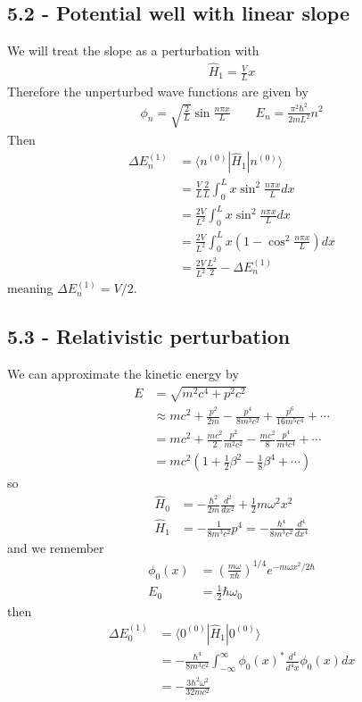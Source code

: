 \documentclass[10pt,a4paper]{book}
\theoremstyle{definition}
\begin{document}
\subsection{5.2 - Potential well with linear slope}
We will treat the slope as a perturbation with
\begin{align}
\hat{H}_1=\frac{V}{L}x
\end{align} 
Therefore the unperturbed wave functions are given by
\begin{align}
\phi_n=\sqrt{\frac{2}{L}}\sin\frac{n\pi x}{L}\qquad
E_n=\frac{\pi^2\hbar^2}{2mL^2}n^2
\end{align}
Then
\begin{align}
\Delta E_n^{(1)}
&=\langle n^{(0)}|\hat{H}_1|n^{(0)}\rangle\\
&=\frac{V}{L}\frac{2}{L}\int_0^L x\sin^2\frac{n\pi x}{L}dx\\
&=\frac{2V}{L^2}\int_0^L x\sin^2\frac{n\pi x}{L}dx\\
&=\frac{2V}{L^2}\int_0^L x\left(1-\cos^2\frac{n\pi x}{L}\right)dx\\
&=\frac{2V}{L^2}\frac{L^2}{2}-\Delta E_n^{(1)}
\end{align}
meaning $\Delta E_n^{(1)}=V/2$.

\subsection{5.3 - Relativistic perturbation}
We can approximate the kinetic energy by
\begin{align}
E&=\sqrt{m^2c^4+p^2c^2}\\
&\approx mc^2+\frac{p^2}{2m}-\frac{p^4}{8m^3c^2}+\frac{p^6}{16m^5c^4}+\cdots\\
&=mc^2+\frac{mc^2}{2}\frac{p^2}{m^2c^2}-\frac{mc^2}{8}\frac{p^4}{m^4c^4}+\cdots\\
&=mc^2\left(1+\frac{1}{2}\beta^2-\frac{1}{8}\beta^4+\cdots\right)
\end{align}
so
\begin{align}
\hat{H}_0&=-\frac{\hbar^2}{2m}\frac{d^2}{dx^2}+\frac{1}{2}m\omega^2x^2\\
\hat{H}_1&=-\frac{1}{8m^3c^2}p^4=-\frac{\hbar^4}{8m^3c^2}\frac{d^4}{dx^4}
\end{align}
and we remember
\begin{align}
\phi_0(x)&=\left(\frac{m\omega}{\pi\hbar}\right)^{1/4}e^{-m\omega x^2/2\hbar}\\
E_0&=\frac{1}{2}\hbar\omega_0
\end{align}
then
\begin{align}
\Delta E_0^{(1)}&=\langle 0^{(0)}|\hat{H}_1|0^{(0)}\rangle\\
&=-\frac{\hbar^4}{8m^3c^2}\int_{-\infty}^\infty\phi_0(x)^*\frac{d^4}{d^4x}\phi_0(x)dx\\
&=-\frac{3\hbar^2\omega^2}{32mc^2}
\end{align}
\end{document}
